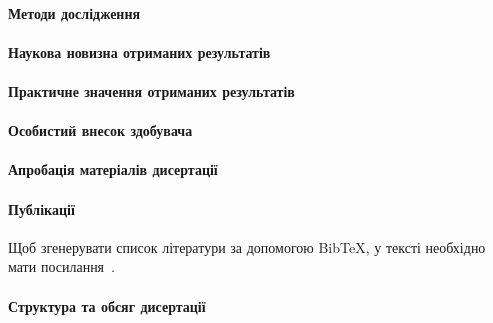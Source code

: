 \documentclass[
]{mon2017dev-aref}[2021/07/21]
\theoremstyle{plain}
\theoremstyle{definition}
\theoremstyle{remark}
\begin{document}
\paragraph{Методи дослідження}

\paragraph{Наукова новизна отриманих результатів}

\paragraph{Практичне значення отриманих результатів}

\paragraph{Особистий внесок здобувача}

\paragraph{Апробація матеріалів дисертації}

\paragraph{Публікації}

Щоб згенерувати список літератури за допомогою Bib\TeX, у тексті
необхідно мати посилання~\cite{Bar98fasp1,Bar98fasp2,PrB01umc}.

\paragraph{Структура та обсяг дисертації}
\end{document}
